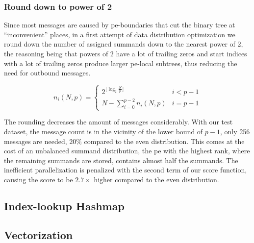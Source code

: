 \subsubsection{Round down to power of 2}
Since most messages are caused by \gls{pe}-boundaries that cut the binary tree at \enquote{inconvenient} places, in a first attempt of data distribution
optimization we round down the number of assigned summands down to the nearest power of $2$,
the reasoning being that powers of $2$ have a lot of trailing
zeros and start indices with a lot of trailing zeros produce larger \gls{pe}-local subtrees, thus reducing the need for outbound messages.

\begin{equation}
\label{eq:roundDownPower2Distribution}
n_i (N, p) = \begin{cases}
2^{\lfloor \log_2 \frac{N}{p} \rfloor} & i < p - 1\\
N - \sum_{i=0}^{p-2} n_i (N,p) & i = p - 1
\end{cases}
\end{equation}

The rounding decreases the amount of messages considerably. With our test dataset, the message count is in the vicinity of the lower bound of $p - 1$, only
256 messages are needed, $20\%$ compared to the even distribution. This comes at the cost of an unbalanced summand distribution, the \gls{pe}
with the highest rank, where the remaining summands are stored, contains almost half the summands.
The inefficient parallelization is penalized with the second term of our score function, causing the score to be $2.7\times$ higher compared to
the even distribution.


\subsection{Index-lookup Hashmap}
\label{sec:IndexLookupHashmap}

\subsection{Vectorization}
\label{sec:Vectorization}